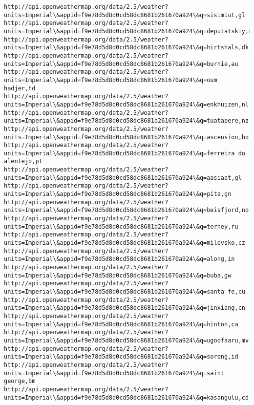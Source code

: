\documentclass[11pt]{article}
\begin{document}
\begin{Verbatim}[commandchars=\\\{\}]
http://api.openweathermap.org/data/2.5/weather?units=Imperial\&appid=f9e78d5d8d0cd58dc8681b261670a924\&q=sisimiut,gl
http://api.openweathermap.org/data/2.5/weather?units=Imperial\&appid=f9e78d5d8d0cd58dc8681b261670a924\&q=deputatskiy,ru
http://api.openweathermap.org/data/2.5/weather?units=Imperial\&appid=f9e78d5d8d0cd58dc8681b261670a924\&q=hirtshals,dk
http://api.openweathermap.org/data/2.5/weather?units=Imperial\&appid=f9e78d5d8d0cd58dc8681b261670a924\&q=burnie,au
http://api.openweathermap.org/data/2.5/weather?units=Imperial\&appid=f9e78d5d8d0cd58dc8681b261670a924\&q=oum hadjer,td
http://api.openweathermap.org/data/2.5/weather?units=Imperial\&appid=f9e78d5d8d0cd58dc8681b261670a924\&q=enkhuizen,nl
http://api.openweathermap.org/data/2.5/weather?units=Imperial\&appid=f9e78d5d8d0cd58dc8681b261670a924\&q=tuatapere,nz
http://api.openweathermap.org/data/2.5/weather?units=Imperial\&appid=f9e78d5d8d0cd58dc8681b261670a924\&q=ascension,bo
http://api.openweathermap.org/data/2.5/weather?units=Imperial\&appid=f9e78d5d8d0cd58dc8681b261670a924\&q=ferreira do alentejo,pt
http://api.openweathermap.org/data/2.5/weather?units=Imperial\&appid=f9e78d5d8d0cd58dc8681b261670a924\&q=aasiaat,gl
http://api.openweathermap.org/data/2.5/weather?units=Imperial\&appid=f9e78d5d8d0cd58dc8681b261670a924\&q=pita,gn
http://api.openweathermap.org/data/2.5/weather?units=Imperial\&appid=f9e78d5d8d0cd58dc8681b261670a924\&q=beisfjord,no
http://api.openweathermap.org/data/2.5/weather?units=Imperial\&appid=f9e78d5d8d0cd58dc8681b261670a924\&q=terney,ru
http://api.openweathermap.org/data/2.5/weather?units=Imperial\&appid=f9e78d5d8d0cd58dc8681b261670a924\&q=milevsko,cz
http://api.openweathermap.org/data/2.5/weather?units=Imperial\&appid=f9e78d5d8d0cd58dc8681b261670a924\&q=along,in
http://api.openweathermap.org/data/2.5/weather?units=Imperial\&appid=f9e78d5d8d0cd58dc8681b261670a924\&q=buba,gw
http://api.openweathermap.org/data/2.5/weather?units=Imperial\&appid=f9e78d5d8d0cd58dc8681b261670a924\&q=santa fe,cu
http://api.openweathermap.org/data/2.5/weather?units=Imperial\&appid=f9e78d5d8d0cd58dc8681b261670a924\&q=jinxiang,cn
http://api.openweathermap.org/data/2.5/weather?units=Imperial\&appid=f9e78d5d8d0cd58dc8681b261670a924\&q=hinton,ca
http://api.openweathermap.org/data/2.5/weather?units=Imperial\&appid=f9e78d5d8d0cd58dc8681b261670a924\&q=ugoofaaru,mv
http://api.openweathermap.org/data/2.5/weather?units=Imperial\&appid=f9e78d5d8d0cd58dc8681b261670a924\&q=sorong,id
http://api.openweathermap.org/data/2.5/weather?units=Imperial\&appid=f9e78d5d8d0cd58dc8681b261670a924\&q=saint george,bm
http://api.openweathermap.org/data/2.5/weather?units=Imperial\&appid=f9e78d5d8d0cd58dc8681b261670a924\&q=kasangulu,cd

\end{Verbatim}
\end{document}
